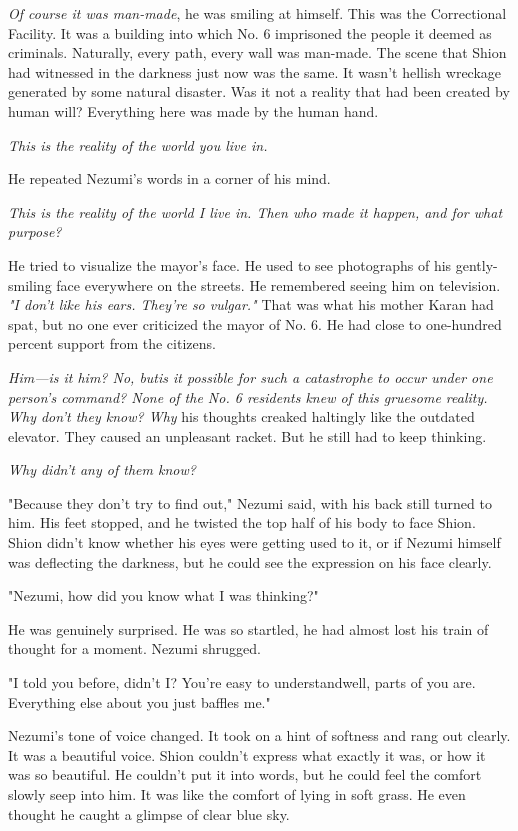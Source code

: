 \emph{Of course it was man-made}, he was smiling at himself. This was the
Correctional Facility. It was a building into which No. 6 imprisoned the
people it deemed as criminals. Naturally, every path, every wall was
man-made. The scene that Shion had witnessed in the darkness just now
was the same. It wasn't hellish wreckage generated by some natural
disaster. Was it not a reality that had been created by human will?
Everything here was made by the human hand.

\emph{This is the reality of the world you live in.}

He repeated Nezumi's words in a corner of his mind.

\emph{This is the reality of the world I live in. Then who made it happen, and
for what purpose?}

He tried to visualize the mayor's face. He used to see photographs of
his gently-smiling face everywhere on the streets. He remembered seeing
him on television. \emph{"I don't like his ears. They're so vulgar."} That was
what his mother Karan had spat, but no one ever criticized the mayor of
No. 6. He had close to one-hundred percent support from the citizens.

\emph{Him---is it him? No, but\el is it possible for such a catastrophe to occur
under one person's command? None of the No. 6 residents knew of this
gruesome reality. Why don't they know? Why\el } his thoughts creaked
haltingly like the outdated elevator. They caused an unpleasant racket.
But he still had to keep thinking.

\emph{Why didn't any of them know?}

"Because they don't try to find out," Nezumi said, with his back still
turned to him. His feet stopped, and he twisted the top half of his body
to face Shion. Shion didn't know whether his eyes were getting used to
it, or if Nezumi himself was deflecting the darkness, but he could see
the expression on his face clearly.

"Nezumi, how did you know what I was thinking?"

He was genuinely surprised. He was so startled, he had almost lost his
train of thought for a moment. Nezumi shrugged.

"I told you before, didn't I? You're easy to understand\el well, parts
of you are. Everything else about you just baffles me."

Nezumi's tone of voice changed. It took on a hint of softness and rang
out clearly. It was a beautiful voice. Shion couldn't express what
exactly it was, or how it was so beautiful. He couldn't put it into
words, but he could feel the comfort slowly seep into him. It was like
the comfort of lying in soft grass. He even thought he caught a glimpse
of clear blue sky.

